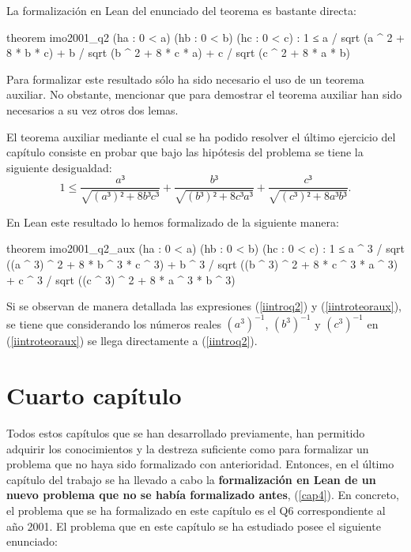 La formalización en Lean del enunciado del teorema es bastante directa:

\begin{leancode}
theorem imo2001_q2
  (ha : 0 < a)
  (hb : 0 < b)
  (hc : 0 < c)
  : 1 ≤ a / sqrt (a ^ 2 + 8 * b * c) +
        b / sqrt (b ^ 2 + 8 * c * a) +
        c / sqrt (c ^ 2 + 8 * a * b)
\end{leancode}

Para formalizar este resultado sólo ha sido necesario el uso de un
teorema auxiliar. No obstante, mencionar que para demostrar el teorema
auxiliar han sido necesarios a su vez otros dos lemas.

El teorema auxiliar mediante el cual se ha podido resolver el último
ejercicio del capítulo consiste en probar que bajo las hipótesis del
problema se tiene la siguiente desigualdad:
\begin{equation}\label{iintroteoraux}
   1 ≤ \frac{a³}{\sqrt{(a³)²+8b³c³}}+\frac{b³}{\sqrt{(b³)²+8c³a³}}+
    \frac{c³}{\sqrt{(c³)²+8a³b³}}.
\end{equation}

En Lean este resultado lo hemos formalizado de la siguiente manera:
\begin{leancode}
theorem imo2001_q2_aux
  (ha : 0 < a)
  (hb : 0 < b)
  (hc : 0 < c)
  : 1 ≤ a ^ 3 / sqrt ((a ^ 3) ^ 2 + 8 * b ^ 3 * c ^ 3) +
        b ^ 3 / sqrt ((b ^ 3) ^ 2 + 8 * c ^ 3 * a ^ 3) +
        c ^ 3 / sqrt ((c ^ 3) ^ 2 + 8 * a ^ 3 * b ^ 3)
\end{leancode}

Si se observan de manera detallada las expresiones (\ref{iintroq2}) y
(\ref{iintroteoraux}), se tiene que considerando los números reales
\((a^{3})^{-1}\), \((b^{3})^{-1}\) y \((c^{3})^{-1}\) en
(\ref{iintroteoraux}) se llega directamente a (\ref{iintroq2}).

\section{Cuarto capítulo}

Todos estos capítulos que se han desarrollado previamente, han permitido
adquirir los conocimientos y la destreza suficiente como para formalizar
un problema que no haya sido formalizado con anterioridad. Entonces, en
el último capítulo del trabajo se ha llevado a cabo la
\textbf{formalización en Lean de un nuevo problema que no se había
formalizado antes}, (\ref{cap4}). En concreto, el problema que se ha
formalizado en este capítulo es el Q6 correspondiente al año 2001. El
problema que en este capítulo se ha estudiado posee el siguiente
enunciado:


